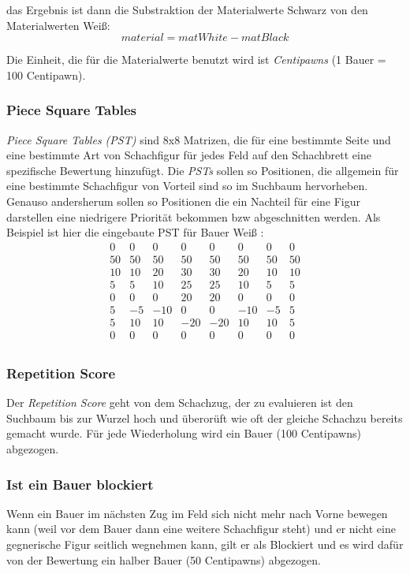 das Ergebnis ist dann die Substraktion der Materialwerte Schwarz von den Materialwerten Weiß: 
$$
material = matWhite - matBlack
$$

Die Einheit, die f\"ur die Materialwerte benutzt wird ist \textit{Centipawns} (1 Bauer = 100 Centipawn).

\subsubsection{Piece Square Tables}
\textit{Piece Square Tables (PST)} sind  8x8 Matrizen, die für eine bestimmte Seite und eine bestimmte Art von Schachfigur für jedes Feld auf den Schachbrett eine spezifische Bewertung hinzuf\"ugt.
Die \textit{PSTs} sollen so Positionen, die allgemein f\"ur eine bestimmte Schachfigur von Vorteil sind so im Suchbaum hervorheben. Genauso andersherum sollen so Positionen die ein Nachteil f\"ur eine Figur darstellen eine niedrigere Priorit\"at bekommen bzw abgeschnitten werden.
\newline Als Beispiel ist hier die eingebaute PST für Bauer Weiß : 
$$
\begin{matrix}
         0 &  0 &  0 &  0 &  0 &  0 &  0 &  0 \\
        50 & 50 & 50 & 50 & 50 & 50 & 50 & 50 \\
        10 & 10 & 20 & 30 & 30 & 20 & 10 & 10 \\
         5 &  5 & 10 & 25 & 25 & 10 &  5 &  5 \\
         0 &  0 &  0 & 20 & 20 &  0 &  0 &  0 \\
         5 & -5 &-10 &  0 &  0 &-10 & -5 &  5 \\
         5 & 10 & 10 &-20 &-20 & 10 & 10 &  5 \\
         0 &  0 &  0 &  0 &  0 &  0 &  0 &  0 \\
\end{matrix}
$$

\subsubsection{Repetition Score}
Der \textit{Repetition Score} geht von dem Schachzug, der zu evaluieren ist den Suchbaum bis zur Wurzel hoch und \"uberor\"uft wie oft der gleiche Schachzu bereits gemacht wurde. F\"ur jede Wiederholung wird ein Bauer (100 Centipawns) abgezogen.
\subsubsection{Ist ein Bauer blockiert}
Wenn ein Bauer im nächsten Zug im Feld sich nicht mehr nach Vorne bewegen kann (weil vor dem Bauer dann eine weitere Schachfigur steht) und er nicht eine gegnerische Figur seitlich wegnehmen kann, gilt er als Blockiert und es wird dafür von der Bewertung ein halber Bauer (50 Centipawns) abgezogen.

